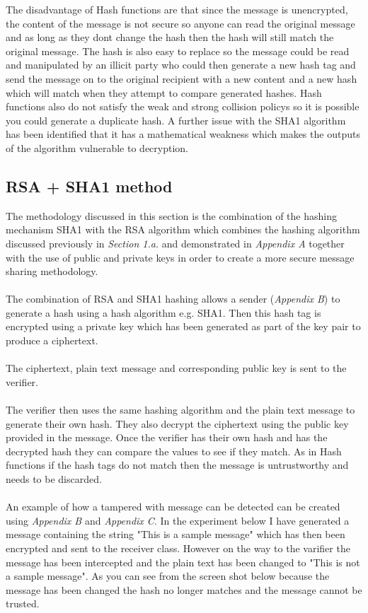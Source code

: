 \documentclass[a4paper, twoside, 11pt]{article}
\begin{document}
The disadvantage of Hash functions are that since the message is unencrypted, the content of the message is not secure so anyone can read the original message and as long as they dont change the hash then the hash will still match the original message. The hash is also easy to replace so the message could be read and manipulated by an illicit party who could then generate a new hash tag and send the message on to the original recipient with a new content and a new hash which will match when they attempt to compare generated hashes. Hash functions also do not satisfy the weak and strong collision policys so it is possible you could generate a duplicate hash. A further issue with the SHA1 algorithm has been identified that it has a mathematical weakness which makes the outputs of the algorithm vulnerable to decryption.

\subsection{RSA + SHA1 method}
The methodology discussed in this section is the combination of the hashing mechanism SHA1 with the RSA algorithm which combines the hashing algorithm discussed previously in \textit{Section 1.a.} and demonstrated in \textit{Appendix A} together with the use of public and private keys in order to create a more secure message sharing methodology. \\
\\
The combination of RSA and SHA1 hashing allows a sender (\textit{Appendix B}) to generate a hash using a hash algorithm e.g. SHA1. Then this hash tag is encrypted using a private key which has been generated as part of the key pair to produce a ciphertext.\\
\\
The ciphertext, plain text message and corresponding public key is sent to the verifier.\\
\\
The verifier then uses the same hashing algorithm and the plain text message to generate their own hash. They also decrypt the ciphertext using the public key provided in the message. Once the verifier has their own hash and has the decrypted hash they can compare the values to see if they match. As in Hash functions if the hash tags do not match then the message is untrustworthy and needs to be discarded. \\
\\
An example of how a tampered with message can be detected can be created using \textit{Appendix B} and \textit{Appendix C}. In the experiment below I have generated a message containing the string "This is a sample message" which has then been encrypted and sent to the receiver class. However on the way to the varifier the message has been intercepted and the plain text has been changed to "This is not a sample message". As you can see from the screen shot below because the message has been changed the hash no longer matches and the message cannot be trusted.
\end{document}
